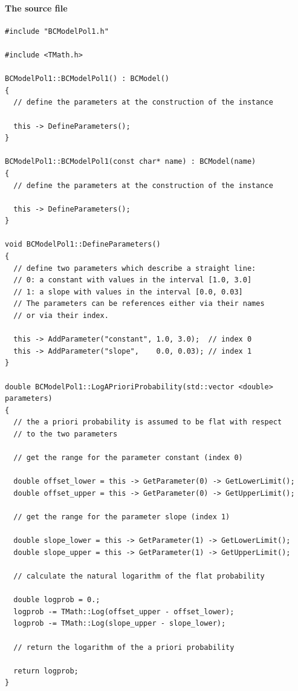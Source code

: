 \documentclass[11pt, a4paper]{article}
\begin{document}
\paragraph{The source file} 
\label{paragraph:sourcefile}
% 
\begin{small} 
\begin{verbatim}
#include "BCModelPol1.h" 

#include <TMath.h> 

BCModelPol1::BCModelPol1() : BCModel()
{
  // define the parameters at the construction of the instance 

  this -> DefineParameters();
}

BCModelPol1::BCModelPol1(const char* name) : BCModel(name)
{
  // define the parameters at the construction of the instance 

  this -> DefineParameters();
}

void BCModelPol1::DefineParameters()
{
  // define two parameters which describe a straight line: 
  // 0: a constant with values in the interval [1.0, 3.0] 
  // 1: a slope with values in the interval [0.0, 0.03]
  // The parameters can be references either via their names 
  // or via their index. 

  this -> AddParameter("constant", 1.0, 3.0);  // index 0
  this -> AddParameter("slope",    0.0, 0.03); // index 1
}

double BCModelPol1::LogAPrioriProbability(std::vector <double> parameters)
{
  // the a priori probability is assumed to be flat with respect 
  // to the two parameters 

  // get the range for the parameter constant (index 0) 

  double offset_lower = this -> GetParameter(0) -> GetLowerLimit();
  double offset_upper = this -> GetParameter(0) -> GetUpperLimit();

  // get the range for the parameter slope (index 1) 

  double slope_lower = this -> GetParameter(1) -> GetLowerLimit();
  double slope_upper = this -> GetParameter(1) -> GetUpperLimit();

  // calculate the natural logarithm of the flat probability

  double logprob = 0.;
  logprob -= TMath::Log(offset_upper - offset_lower);
  logprob -= TMath::Log(slope_upper - slope_lower);

  // return the logarithm of the a priori probability 

  return logprob;
}


\end{verbatim}
\end{small}
\end{document}

